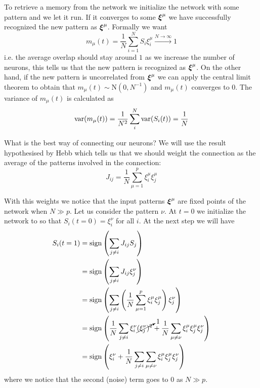 \documentclass[12pt]{extarticle}
\renewcommand{\vec}[1]{\bvec{#1}}
\begin{document}
To retrieve a memory from the network we initialize the network with some pattern and we let it run.
If it converges to some $\vec \xi^\mu$ we have successfully recognized the new pattern as
$\vec \xi^\mu$. Formally we want
\begin{equation}
	m_\mu(t) = \frac{1}{N} \sum_{i = 1}^N S_i \xi^\mu_i \xrightarrow{ N \to \infty } 1
\end{equation}
i.e. the average overlap should stay around $1$ as we increase the number of neurons, this tells us
that the new pattern is recognized as $\vec \xi^\mu$.
On the other hand, if the new pattern is uncorrelated from $\vec \xi^\mu$ we can apply the central
limit theorem to obtain that $m_\mu(t) \sim \mathrm{N}(0, N^{-1})$ and $m_\mu(t)$ converges to $0$.
The variance of $m_\mu(t)$ is calculated as
\begin{equation}
	\var (m_\mu(t)) = \frac{1}{N^2} \sum_i^N \var(S_i(t)) = \frac{1}{N}
\end{equation}



What is the best way of connecting our neurons? We will use the result hypothesised by Hebb which
tells us that we should weight the connection as the average of the patterns involved in the
connection:
\begin{equation}
	J_{ij} = \frac{1}{N} \sum_{\mu = 1}^p \xi_i^\mu \xi_j^\mu
\end{equation}

With this weights we notice that the input patterns $\vec \xi^\mu$ are fixed points of the network
when $N \gg p$.
Let us consider the pattern $\nu$.
At $t = 0$ we initialize the network to so that $S_i(t=0) = \xi^\nu_i$ for all $i$.
At the next step we will have
\begin{align}
	S_i(t=1) & = \mathrm{sign}\left( \sum_{j \neq i} J_{ij} S_j \right)                                                                                                        \\
	         & = \mathrm{sign}\left( \sum_{j \neq i} J_{ij} \xi^\nu_j \right)                                                                                                  \\
	         & = \mathrm{sign}\left( \sum_{j \neq i} \left(\frac{1}{N} \sum_{\mu = 1}^p \xi_i^\mu \xi_j^\mu\right) \xi^\nu_j \right)                                           \\
	         & = \mathrm{sign}\left( \frac{1}{N} \sum_{j \neq i} \xi^\nu_i \cancelto{1}{(\xi^\nu_j)^2} + \frac{1}{N} \sum_{\mu \neq \nu} \xi_i^\mu \xi_j^\mu \xi^\nu_j \right) \\
	         & = \mathrm{sign}\left( \xi^\nu_i + \frac{1}{N} \sum_{j \neq i} \sum_{\mu \neq \nu} \xi_i^\mu \xi_j^\mu \xi^\nu_j \right)
\end{align}
where we notice that the second (noise) term goes to $0$ as $N \gg p$.
\end{document}
